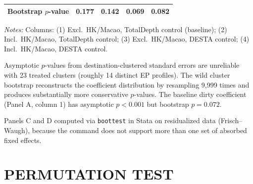 \documentclass{article}
\begin{document}
\begin{table}[htbp]
\begin{threeparttable}
\begin{tabular}{lcccc}
\quad Bootstrap $p$-value & 0.177 & 0.142 & 0.069 & 0.082 \\
\bottomrule
\end{tabular}
\begin{tablenotes}[flushleft]\footnotesize
\item \emph{Notes:} Columns: (1) Excl.\ HK/Macao, TotalDepth control (baseline); (2) Incl.\ HK/Macao, TotalDepth control; (3) Excl.\ HK/Macao, DESTA control; (4) Incl.\ HK/Macao, DESTA control.
\item Asymptotic $p$-values from destination-clustered standard errors are unreliable with 23 treated clusters (roughly 14 distinct EP profiles). The wild cluster bootstrap reconstructs the coefficient distribution by resampling 9,999 times and produces substantially more conservative $p$-values. The baseline dirty coefficient (Panel A, column 1) has asymptotic $p < 0.001$ but bootstrap $p = 0.072$.
\item Panels C and D computed via \texttt{boottest} in Stata on residualized data (Frisch--Waugh), because the command does not support more than one set of absorbed fixed effects.
\end{tablenotes}
\end{threeparttable}
\end{table}


\newpage
\section{PERMUTATION TEST}
\end{document}
